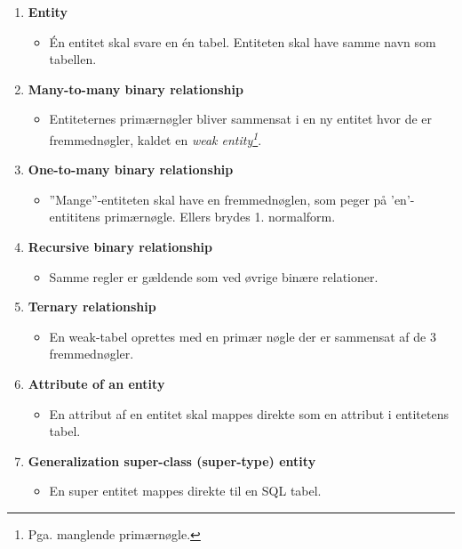 \begin{enumerate}
	\item \textbf{Entity}
	\begin{itemize}
		\item Én entitet skal svare en én tabel. Entiteten skal have samme navn som tabellen.
	\end{itemize}
	
	\item \textbf{Many-to-many binary relationship}
	\begin{itemize}
		\item Entiteternes primærnøgler bliver sammensat i en ny entitet hvor de er fremmednøgler, kaldet en \textit{weak entity\footnote{Pga. manglende primærnøgle.}}.
	\end{itemize}
	
	\item \textbf{One-to-many binary relationship}
	\begin{itemize}
		\item ''Mange''-entiteten skal have en fremmednøglen, som peger på 'en'-entititens primærnøgle. Ellers brydes 1. normalform.
	\end{itemize}
			
	\item \textbf{Recursive binary relationship}
	\begin{itemize}
		\item Samme regler er gældende som ved øvrige binære relationer.
	\end{itemize}
	
	\item \textbf{Ternary relationship}
	\begin{itemize}
		\item En weak-tabel oprettes med en primær nøgle der er sammensat af de 3 fremmednøgler.
	\end{itemize}
	
	\item \textbf{Attribute of an entity}
	\begin{itemize}
		\item En attribut af en entitet skal mappes direkte som en attribut i entitetens tabel.
	\end{itemize}
	
	\item \textbf{Generalization super-class (super-type) entity}
	\begin{itemize}
		\item En super entitet mappes direkte til en SQL tabel.
	\end{itemize}
	

\end{enumerate}
